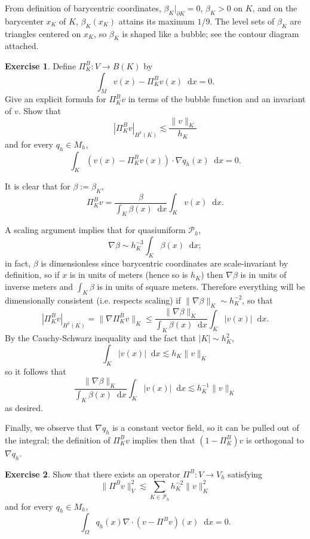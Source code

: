 \documentclass[10pt]{article}
\newcommand*\dif{\mathop{}\!\mathrm{d}}
\theoremstyle{definition}
\newtheorem{exer}{Exercise}
\begin{document}
From definition of barycentric coordinates, $\beta_K|_{\partial K} = 0$, $\beta_K > 0$ on $K$, and on the barycenter $x_K$ of $K$, $\beta_K(x_K)$ attains its maximum $1/9$.
The level sets of $\beta_K$ are triangles centered on $x_K$, so $\beta_K$ is shaped like a bubble; see the contour diagram attached.

\begin{exer}
Define $\Pi^B_K : V \to B(K)$ by 
$$\int_M v(x) - \Pi^B_K v(x) \dif x = 0.$$
Give an explicit formula for $\Pi^B_K v$ in terms of the bubble function and an invariant of $v$.
Show that 
$$|\Pi^B_K v|_{H^1(K)} \lesssim \frac{\|v\|_K}{h_K}$$
and for every $q_h \in M_h$,
$$\int_K (v(x) - \Pi^B_K v(x)) \cdot \nabla q_h(x) \dif x = 0.$$
\end{exer}

It is clear that for $\beta := \beta_K$,
$$\Pi^B_K v = \frac{\beta}{\int_K \beta(x) \dif x} \int_K v(x) \dif x.$$

A scaling argument implies that for quasiuniform $\mathcal P_h$,
$$\nabla \beta \sim h_K^{-3} \int_K \beta(x) \dif x;$$
in fact, $\beta$ is dimensionless since barycentric coordinates are scale-invariant by definition, so if $x$ is in units of meters (hence so is $h_K$) then $\nabla \beta$ is in units of inverse meters and $\int_K \beta$ is in units of square meters.
Therefore everything will be dimensionally consistent (i.e. respects scaling) if $\|\nabla \beta\|_K \sim h_K^{-2}$, so that
$$|\Pi^B_K v|_{H^1(K)} = \|\nabla \Pi^B_K v\|_K \leq \frac{\|\nabla \beta\|_K}{\int_K \beta(x) \dif x} \int_K |v(x)| \dif x.$$
By the Cauchy-Schwarz inequality and the fact that $|K| \sim h_K^2$,
$$ \int_K |v(x)| \dif x \lesssim h_K \|v\|_K$$
so it follows that 
$$ \frac{\|\nabla \beta\|_K}{\int_K \beta(x) \dif x} \int_K |v(x)| \dif x \lesssim h_K^{-1} \|v\|_K$$
as desired.

Finally, we observe that $\nabla q_h$ is a constant vector field, so it can be pulled out of the integral; the definition of $\Pi^B_K v$ implies then that $(1 - \Pi^B_K)v$ is orthogonal to $\nabla q_h$.

\begin{exer}
    Show that there exists an operator $\Pi^B: V \to V_h$ satisfying
    $$\|\Pi^B v\|_V^2 \lesssim \sum_{K \in \mathcal P_h} h_K^{-2} \|v\|_K^2$$
    and for every $q_h \in M_h$,
    $$\int_\Omega q_h(x) \nabla \cdot (v - \Pi^B v)(x) \dif x = 0.$$
\end{exer}
\end{document}
